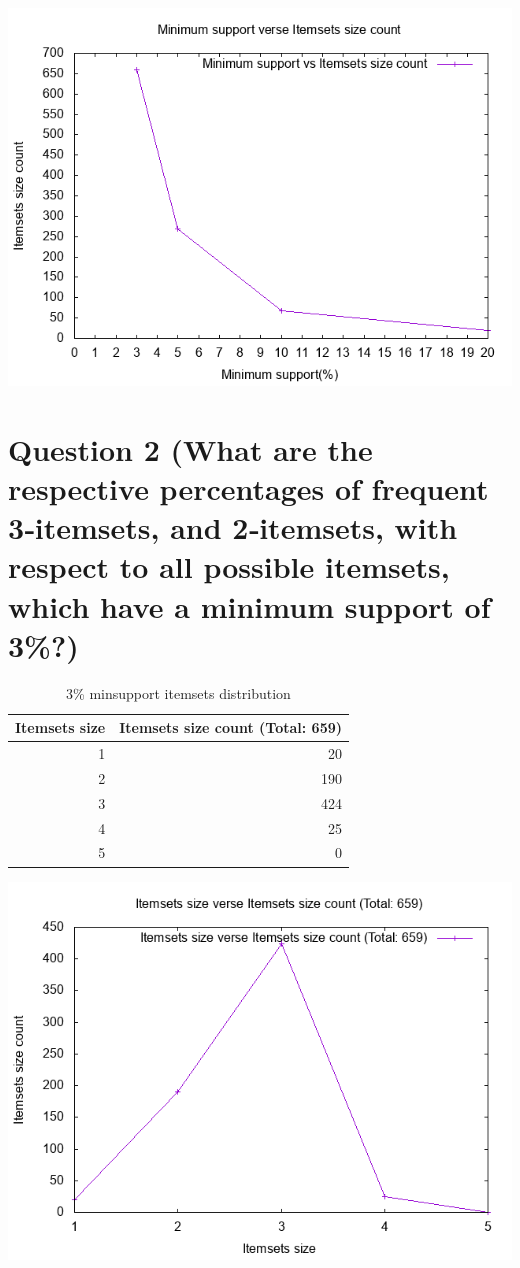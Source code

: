 \documentclass[titlepage]{article}
\begin{document}
\begin{center}
\includegraphics[width=.9\linewidth]{img/frequent.png}
\end{center}

\section{Question 2 (What are the respective percentages of frequent 3‐itemsets, and 2‐itemsets, with respect to all possible itemsets, which have a minimum support of 3\%?)}
\label{sec:org2848804}

\begin{table}[htbp]
\caption{\label{tab:org867b394}
3\% minsupport itemsets distribution}
\centering
\begin{tabular}{rr}
Itemsets size & Itemsets size count (Total: 659)\\
\hline
1 & 20\\
2 & 190\\
3 & 424\\
4 & 25\\
5 & 0\\
\end{tabular}
\end{table}

\begin{center}
\includegraphics[width=.9\linewidth]{img/itemsets.png}
\end{center}
\end{document}
